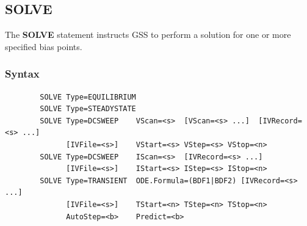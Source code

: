 \documentclass[11pt,pdftex]{article}
\begin{document}
\newpage
\subsection{SOLVE}
The \textbf{SOLVE} statement instructs GSS to perform a solution for one or more
specified bias points.

\subsubsection*{Syntax}
\begin{verbatim}
        SOLVE Type=EQUILIBRIUM
        SOLVE Type=STEADYSTATE
        SOLVE Type=DCSWEEP    VScan=<s>  [VScan=<s> ...]  [IVRecord=<s> ...]
              [IVFile=<s>]    VStart=<s> VStep=<s> VStop=<n>
        SOLVE Type=DCSWEEP    IScan=<s>  [IVRecord=<s> ...]
              [IVFile=<s>]    IStart=<s> IStep=<s> IStop=<n>
        SOLVE Type=TRANSIENT  ODE.Formula=(BDF1|BDF2) [IVRecord=<s> ...]
              [IVFile=<s>]    TStart=<n> TStep=<n> TStop=<n>
              AutoStep=<b>    Predict=<b>
\end{verbatim}
\end{document}
